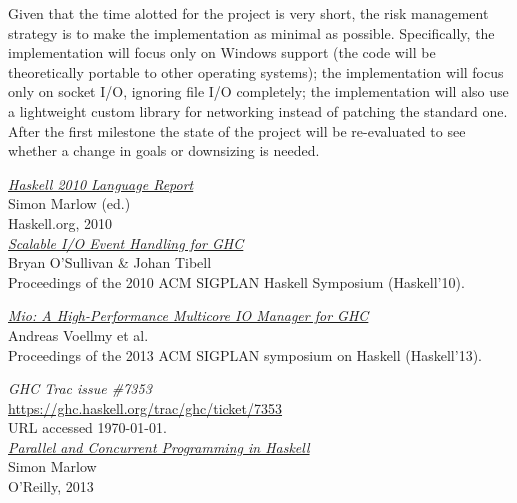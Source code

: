 \documentclass[10pt, oneside]{article}
\begin{document}
Given that the time alotted for the project is very short, the risk management
strategy is to make the implementation as minimal as possible. Specifically, the
implementation will focus only on Windows support (the code will be
theoretically portable to other operating systems); the implementation will
focus only on socket I/O, ignoring file I/O completely; the implementation will
also use a lightweight custom library for networking instead of patching the
standard one. After the first milestone the state of the project will be
re-evaluated to see whether a change in goals or downsizing is needed.

\pagebreak

\begin{thebibliography}{9}
\label{sec:refs}

  \newblock
  \href{https://www.haskell.org/onlinereport/haskell2010/}{\emph{Haskell 2010
      Language Report}}\\
  \newblock Simon Marlow (ed.)\\
  \newblock Haskell.org, 2010\\

  \newblock \href{http://research.google.com/pubs/pub36841.html}{\emph{Scalable I/O Event Handling for GHC}}\\
  \newblock Bryan O'Sullivan \& Johan Tibell\\
  \newblock Proceedings of the 2010 ACM SIGPLAN Haskell Symposium (Haskell'10).

  \newblock \href{http://haskell.cs.yale.edu/wp-content/uploads/2013/08/hask035-voellmy.pdf}{\emph{Mio:
      A High-Performance Multicore IO
      Manager for GHC}}\\
  \newblock Andreas Voellmy et al.\\
  \newblock Proceedings of the 2013 ACM SIGPLAN symposium on Haskell
  (Haskell'13).

 \emph{GHC Trac issue \#7353}\\
  \newblock \url{https://ghc.haskell.org/trac/ghc/ticket/7353}\\
  \newblock URL accessed \today.\\

  \newblock \href{http://community.haskell.org/~simonmar/pcph/}{\emph{Parallel and
      Concurrent Programming in
      Haskell}}\\
  \newblock Simon Marlow\\
  \newblock O'Reilly, 2013\\


\end{thebibliography}
\end{document}
